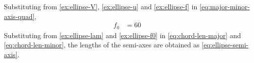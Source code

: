 %
    Substituting
from 
	    \eqref{ex:ellipse-V},
	    \eqref{ex:ellipse-u}
	    and
	    \eqref{ex:ellipse-f}
	    in
	  \eqref{eq:major-minor-axis-quad},
    \begin{align}
	    f_0 
	    &= 60
	    \label{ex:ellipse-f0}
    \end{align}
    Substituting from 
	    \eqref{ex:ellipse-lam}
	    and 
	    \eqref{ex:ellipse-f0}
	    in 
\eqref{eq:chord-len-major}
and
\eqref{eq:chord-len-minor}, 
    the lengths of the semi-axes are obtained as 
		\eqref{eq:ellipse-semi-axis}.

